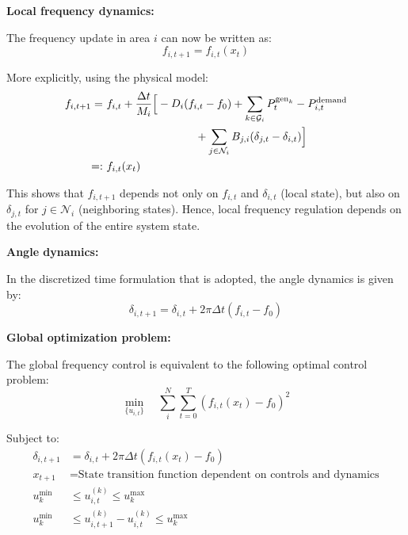 \documentclass{article}
\begin{document}
\textbf{Local frequency dynamics:}

The frequency update in area $i$ can now be written as:
\begin{equation}
    f_{i,t+1} = f_{i,t}(x_t)
\end{equation}


More explicitly, using the physical model:
\begin{align}
    f_{i,t+1} =\ & f_{i,t} + \frac{\Delta t}{M_i} \Big[ -D_i(f_{i,t} - f_0) 
    + \sum_{k \in \mathcal{G}_i} P^{\text{gen}_k}_t 
    - P^{\text{demand}}_{i,t} \notag \\
    &\qquad\qquad\qquad\qquad
    + \sum_{j \in \mathcal{N}_i} B_{j,i}(\delta_{j,t} - \delta_{i,t}) \Big] \\
    =:\ & f_{i,t}(x_t)
\end{align}

This shows that $f_{i,t+1}$ depends not only on $f_{i,t}$ and $\delta_{i,t}$ (local state), but also on $\delta_{j,t}$ for $j \in \mathcal{N}_i$ (neighboring states). Hence, local frequency regulation depends on the evolution of the entire system state.

\textbf{Angle dynamics:}

In the discretized time formulation that is adopted, the angle dynamics is given by:
\begin{equation}
    \delta_{i,t+1} = \delta_{i,t} + 2\pi \Delta t (f_{i,t} - f_0)
\end{equation}

\textbf{Global optimization problem:}

The global frequency control is equivalent to the following optimal control problem:
\begin{equation}
\min_{\{u_{i,t}\}} \quad \sum_i^N \sum_{t=0}^{T} \left( f_{i,t}(x_t) - f_0 \right)^2
\end{equation}

Subject to:
\begin{align}
    \delta_{i,t+1} &= \delta_{i,t} + 2\pi \Delta t (f_{i,t}(x_t) - f_0) \\
    x_{t+1} &= \text{State transition function dependent on controls and dynamics} \\
    u^{\min}_k &\leq u_{i,t}^{(k)} \leq u^{\max}_k \\
    u^{\min}_k &\leq u_{i,t+1}^{(k)} - u_{i,t}^{(k)} \leq u^{\max}_k
\end{align}
\end{document}

